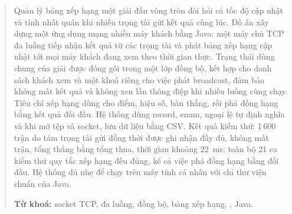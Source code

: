 \begin{abstract}

Quản lý bảng xếp hạng một giải đấu vòng tròn đòi hỏi cả tốc độ cập nhật và
tính nhất quán khi nhiều trọng tài gửi kết quả cùng lúc. Đồ án xây dựng một
ứng dụng mạng nhiều máy khách bằng Java: một máy chủ TCP đa luồng tiếp nhận kết
quả từ các trọng tài và phát bảng xếp hạng cập nhật tới mọi máy khách đang xem
theo thời gian thực. Trạng thái dùng chung của giải được đóng gói trong một
lớp đồng bộ, kết hợp  cho danh sách khách xem và
một khoá riêng cho việc phát broadcast, đảm bảo không mất kết quả và không
xen lẫn thông điệp khi nhiều luồng cùng chạy. Tiêu chí xếp hạng dùng
 cho điểm, hiệu số, bàn thắng, rồi phá đồng
hạng bằng kết quả đối đầu. Hệ thống dùng record, enum, ngoại lệ tự định nghĩa
và  khi mở tệp và socket, lưu dữ liệu bằng CSV. Kết
quả kiểm thử: 1\,600 trận do tám trọng tài gửi đồng thời được ghi nhận đầy đủ,
không mất trận, tổng thắng bằng tổng thua, thời gian khoảng 22~ms; toàn bộ 21
ca kiểm thử quy tắc xếp hạng đều đúng, kể cả việc phá đồng hạng bằng đối đầu.
Hệ thống đủ nhẹ để chạy trên máy tính cá nhân với chỉ thư viện chuẩn của Java.

\vspace{0.8em}
\noindent\textbf{Từ khoá:} socket TCP, đa luồng, đồng bộ, bảng xếp hạng,
, Java.

\end{abstract}
